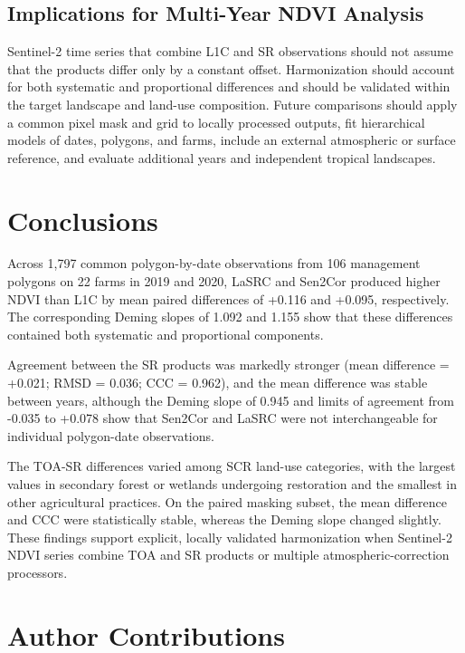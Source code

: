 \documentclass[remotesensing,article,submit,pdftex,oneauthor]{Definitions/mdpi}
\begin{document}
\subsection{Implications for Multi-Year NDVI
Analysis}\label{sec-outlook}

Sentinel-2 time series that combine L1C and SR observations should not
assume that the products differ only by a constant offset. Harmonization
should account for both systematic and proportional differences and
should be validated within the target landscape and land-use
composition. Future comparisons should apply a common pixel mask and
grid to locally processed outputs, fit hierarchical models of dates,
polygons, and farms, include an external atmospheric or surface
reference, and evaluate additional years and independent tropical
landscapes.

\section{Conclusions}\label{sec-conclusions}

Across 1,797 common polygon-by-date observations from 106 management
polygons on 22 farms in 2019 and 2020, LaSRC and Sen2Cor produced higher
NDVI than L1C by mean paired differences of +0.116 and +0.095,
respectively. The corresponding Deming slopes of 1.092 and 1.155 show
that these differences contained both systematic and proportional
components.

Agreement between the SR products was markedly stronger (mean difference
= +0.021; RMSD = 0.036; CCC = 0.962), and the mean difference was stable
between years, although the Deming slope of 0.945 and limits of
agreement from -0.035 to +0.078 show that Sen2Cor and LaSRC were not
interchangeable for individual polygon-date observations.

The TOA-SR differences varied among SCR land-use categories, with the
largest values in secondary forest or wetlands undergoing restoration
and the smallest in other agricultural practices. On the paired masking
subset, the mean difference and CCC were statistically stable, whereas
the Deming slope changed slightly. These findings support explicit,
locally validated harmonization when Sentinel-2 NDVI series combine TOA
and SR products or multiple atmospheric-correction processors.

\section*{Author Contributions}\label{author-contributions}
\end{document}

